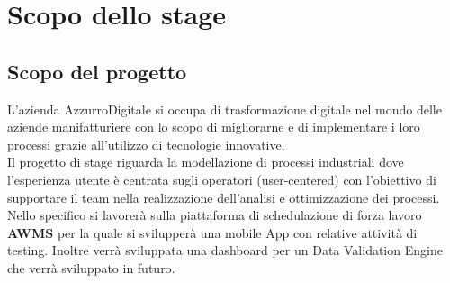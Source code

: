 \section{Scopo dello stage}
\subsection{Scopo del progetto}
L'azienda AzzurroDigitale si occupa di trasformazione digitale nel mondo delle aziende manifatturiere con lo scopo di migliorarne e di implementare i loro processi grazie all'utilizzo di tecnologie innovative.\\

Il progetto di stage riguarda la modellazione di processi industriali dove l'esperienza utente è centrata sugli operatori (user-centered) con l'obiettivo di supportare il team nella realizzazione dell'analisi e ottimizzazione dei processi. Nello specifico si lavorerà sulla piattaforma di schedulazione di forza lavoro \textbf{AWMS} per la quale si svilupperà una mobile App con relative attività di testing. Inoltre verrà sviluppata una dashboard per un Data Validation Engine che verrà sviluppato in futuro.

